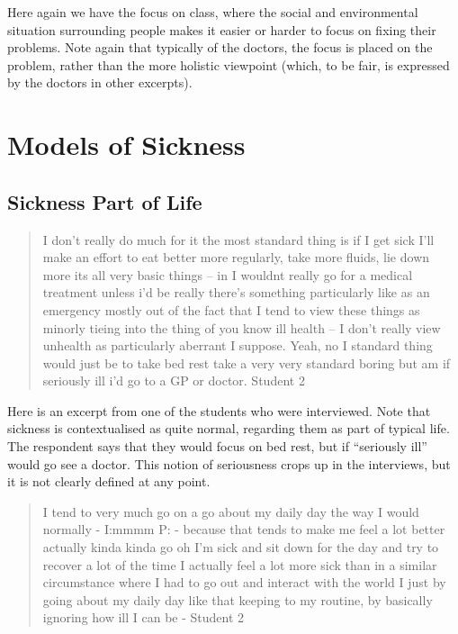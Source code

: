 Here again we have the focus on class, where the social and environmental situation surrounding people makes it easier or harder to focus on fixing their problems. Note again that typically of the doctors, the focus is placed on the problem, rather than the more holistic viewpoint (which, to be fair, is expressed by the doctors in other excerpts). 


\section{Models of Sickness}
\label{sec:models-sickness}



\subsection{Sickness Part of Life}
\label{sec:sickness-part-life}

\begin{quotation}
  I don't really do much for it the most standard thing is if I get sick I'll make an effort to eat better more regularly, take more fluids, lie down more its all very basic things – in I wouldnt really go for a medical treatment unless i'd be really there's something particularly like as an emergency mostly out of the fact that I tend to view these things as minorly tieing into the thing of you know ill health – I don't really view unhealth as particularly aberrant I suppose. Yeah, no I standard thing would just be to take bed rest take a very very standard boring but am if seriously ill i'd go to a GP or doctor.
Student 2
\end{quotation}

Here is an excerpt from one of the students who were interviewed. Note that sickness is contextualised as quite normal, regarding them as part of typical life. The respondent says that they would focus on bed rest, but if ``seriously ill'' would go see a doctor. This notion of seriousness crops up in the interviews, but it is not clearly defined at any point. 

\begin{quotation}
  I tend to very much go on a go about my daily day the way I would normally -
I:mmmm
P: - because that tends to make me feel a lot better actually kinda kinda go oh I'm sick and sit down for the day and try to recover a lot of the time I actually feel a lot more sick than in a similar circumstance where I had to go out and interact with the world I just by going about my daily day like that keeping to my routine, by basically ignoring how ill I can be -
Student 2
\end{quotation}

